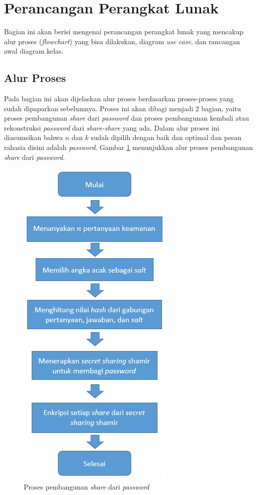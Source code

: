 \section{Perancangan Perangkat Lunak}

Bagian ini akan berisi mengenai perancangan perangkat lunak yang mencakup alur proses (\textit{flowchart}) yang bisa dilakukan, diagram \textit{use case}, dan rancangan awal diagram kelas.

\subsection{Alur Proses}

Pada bagian ini akan dijelaskan alur proses berdasarkan proses-proses yang sudah dipaparkan sebelumnya. Proses ini akan dibagi menjadi 2 bagian, yaitu proses pembangunan \textit{share} dari \textit{password} dan proses pembangunan kembali atau rekonstruksi \textit{password} dari \textit{share-share} yang ada. Dalam alur proses ini diasumsikan bahwa \begin{math}n\end{math} dan \begin{math}k\end{math} sudah dipilih dengan baik dan optimal dan pesan rahasia disini adalah \textit{password}. Gambar \ref{fig:create_share} menunjukkan alur proses pembangunan \textit{share} dari \textit{password}.

\begin{figure}[H]
	\centerline{\includegraphics[scale=0.65]{Gambar/flowchart_share}}
	\caption{Proses pembangunan \textit{share} dari \textit{password}}\label{fig:create_share}
\end{figure}

